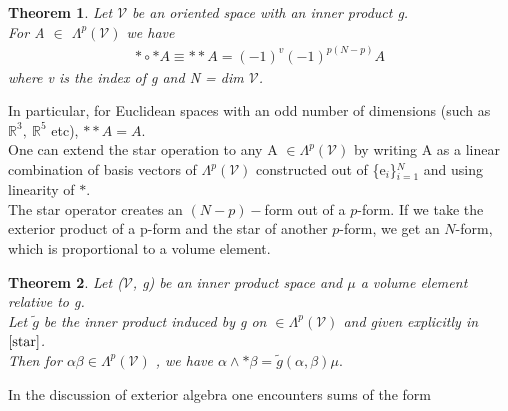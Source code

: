 \documentclass[12pt,a4paper]{article}
\newtheorem{thm}{Theorem}
\begin{document}
\begin{thm}
Let $\mathcal{V}$ be an oriented space with an inner product g.\\
For A $\in$ $\Lambda^{p}(\mathcal{V})$ we have
\begin{align*}
\ast \circ \ast A \equiv \ast \ast A = (-1)^v(-1)^{p(N-p)}A
\end{align*}
where v is the index of g and N = dim $\mathcal{V}$.
\end{thm}
In particular, for Euclidean spaces with an odd number of dimensions
(such as $\mathbb{R}^3, \ \mathbb{R}^5$ etc), $\ast \ast A = A.$\\
One can extend the star operation to any A $\in \Lambda^{p}(\mathcal{V})$ by writing A as a linear combination of basis vectors of $\Lambda^{p}(\mathcal{V})$ constructed out of 
\{e$_i$\}$^N_{i=1}$ and using linearity of $\ast$.\\
The star operator creates an $(N - p)-$form out of a $p$-form. If we take
the exterior product of a p-form and the star of another $p$-form, we get an
$N$-form, which is proportional to a volume element.
\begin{thm}
Let ($\mathcal{V}$, g) be an inner product space and $\mu$ a volume element relative to g. \\Let $\widetilde{g}$ be the inner product induced by g on $\in \Lambda^{p}(\mathcal{V})$  and given explicitly in $\ref{star}$. \\Then for $\alpha \beta \in \Lambda^{p}(\mathcal{V})$ , we have $\alpha \wedge \ast \beta = \widetilde{g}(\alpha, \beta) \mu.$
\end{thm}
In the discussion of exterior algebra one encounters sums of the form
\end{document}
